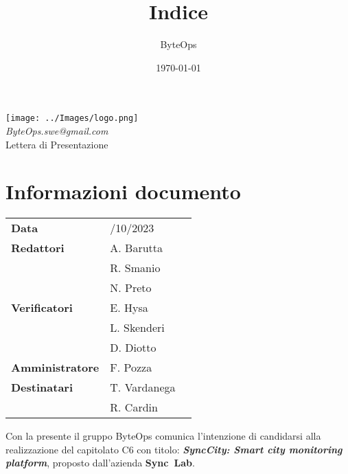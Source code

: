 \documentclass{article}
\title{\textbf{\fontsize{30}{6}\selectfont Indice}}
\author{\fontsize{14}{6}\selectfont ByteOps}
\date{\today}
\begin{document}
\pagestyle{fancy}
\begin{center}
\texttt{[image: ../Images/logo.png]} \\
\vspace{0.2cm}
\textcolor[RGB]{60, 60, 60}{\textit{ByteOps.swe@gmail.com}} \\
\vspace{1cm}
\fontsize{16}{6}\selectfont Lettera di Presentazione\\
\vspace{0.5cm}
\end{center}

\section*{Informazioni documento}
\def\arraystretch{1.2}
\begin{tabular}{>{\raggedleft\arraybackslash}p{}|>{\raggedright\arraybackslash}p{}c}
\hline
\addlinespace

    \textbf{Data} & 24/10/2023 \vspace{10pt} \\
    \textbf{Redattori} & A. Barutta \\ & R. Smanio \\ & N. Preto \vspace{10pt} \\
    \textbf{Verificatori} & E. Hysa \\ & L. Skenderi \\ & D. Diotto \vspace{10pt} \\
    \textbf{Amministratore} & F. Pozza \vspace{10pt} \\
    \textbf{Destinatari} & T. Vardanega \\ & R. Cardin \vspace{10pt} \\
\end{tabular}
\pagebreak 

\flushleft

Con la presente il gruppo ByteOps comunica l’intenzione di candidarsi alla realizzazione del capitolato C6 con titolo: \textbf{\textit{SyncCity: Smart city monitoring platform}}, proposto dall'azienda \mbox{\textbf{Sync Lab}}.
\vspace{0.5cm}
\end{document}
